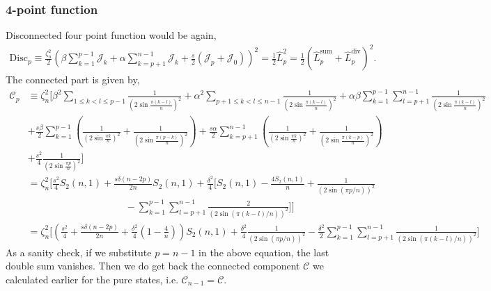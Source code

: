 \documentclass[11pt]{article}
\newcommand{\nn}{\nonumber}
\newcommand{\lb}{\left(}
\newcommand{\rb}{\right)}
\begin{document}
\subsubsection{4-point function}
Disconnected four point function would be again,
\begin{align}
    \text{Disc}_p \equiv \frac{\zeta_n^2}{2}\lb \beta \sum_{k=1}^{p-1}\mathcal{J}_k + \alpha \sum_{k=p+1}^{n-1}\mathcal{J}_k + \frac{s}{2}\lb\mathcal{J}_{p} + \mathcal{J}_{0}\rb\rb^2 = \frac{1}{2}\hat{L}^2_p = \frac{1}{2}\lb \hat{L}_p^{\text{sum}} + \hat{L}_p^{\text{div}}\rb^2 .
\end{align}
The connected part is given by,
\begin{align}
    \mathcal{C}_p &\equiv \zeta_n^2 \Bigg[ \beta^2 \sum_{1\leq k < l \leq p-1} \frac{1}{\lb2\sin \frac{\pi (k-l)}{n}\rb^2} + \alpha^2 \sum_{p+1\leq k < l \leq n-1} \frac{1}{\lb2\sin \frac{\pi (k-l)}{n}\rb^2} +\alpha\beta \sum_{k=1 }^{p-1}\sum_{l=p+1}^{n-1} \frac{1}{\lb2\sin \frac{\pi (k-l)}{n}\rb^2} \nn\\
    &+\frac{s\beta}{2} \sum_{k=1}^{p-1} \lb \frac{1}{\lb2\sin \frac{\pi k}{n}\rb^2} + \frac{1}{\lb2\sin \frac{\pi (p-k)}{n}\rb^2}  \rb + \frac{s\alpha}{2} \sum_{k=p+1}^{n-1} \lb  \frac{1}{\lb2\sin \frac{\pi k}{n}\rb^2} + \frac{1}{\lb2\sin \frac{\pi (k-p)}{n}\rb^2} \rb\nn \\
    & + \frac{s^2}{4}\frac{1}{\lb2\sin \frac{\pi p}{n}\rb^2} \Bigg]\\
    &= \zeta_n^2 \Bigg[ \frac{s^2}{4}S_2(n,1) + \frac{s\delta (n-2p)}{2n}S_2(n,1) + \frac{\delta^2 }{4}\Big[S_2(n,1) - \frac{4S_2(n,1)}{n} +\frac{1}{\lb2\sin(\pi p/n)\rb^2} \nn \\
    &\qquad \qquad \qquad \qquad \qquad - \sum_{k=1}^{p-1}\sum_{l=p+1}^{n-1}\frac{2}{\lb2\sin(\pi(k-l)/n)\rb^2} \Big]\Bigg] \\
    &= \zeta_n^2 \Bigg[ \lb\frac{s^2}{4} + \frac{s\delta (n-2p)}{2n} + \frac{\delta^2}{4}\lb1-\frac{4}{n}\rb\rb S_2(n,1) + \frac{\delta^2}{4}\frac{1}{\lb2\sin(\pi p/n)\rb^2} - \frac{\delta^2}{2}\sum_{k=1}^{p-1}\sum_{l=p+1}^{n-1}\frac{1}{\lb2\sin(\pi(k-l)/n)\rb^2}\Bigg] 
\end{align}
As a sanity check, if we substitute $p = n-1$ in the above equation, the last double sum vanishes. Then we do get back the connected component $\mathcal{C}$ we calculated earlier for the pure states, i.e. $\mathcal{C}_{n-1} = \mathcal{C}$. 
\end{document}
